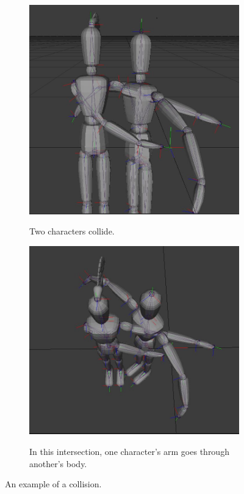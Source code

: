 \begin{figure}[]
	\centering
        \begin{subfigure}[b!]{0.45\textwidth}
        	\centering
                \includegraphics[width=\linewidth]{img/intersection}
                \label{fig:self}
                \caption{Two characters collide.}
        \end{subfigure}
        \quad
        \begin{subfigure}[b!]{0.45\textwidth}
        	\centering
                \includegraphics[width=\linewidth]{img/intersection1}
                \label{fig:self1}
                \caption{In this intersection, one character's arm goes through another's body.}
        \end{subfigure}%
        \caption{An example of a collision.}
	\label{fig:selfcollisions}
\end{figure}